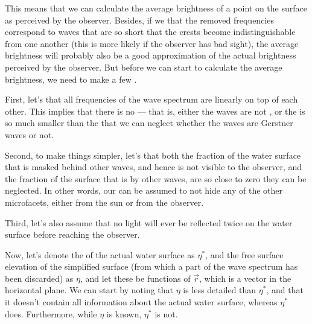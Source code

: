 This means that we can calculate the average brightness of a point on the surface as perceived by the observer. Besides, if we \assume that the removed frequencies correspond to waves that are so short that the crests become indistinguishable from one another (this is more likely if the observer has bad sight), the average brightness will probably also be a good approximation of the actual brightness perceived by the observer. But before we can start to calculate the average brightness, we need to make a few \assumptions.

First, let's \assume that all frequencies of the wave spectrum are \superposed linearly on top of each other. This implies that there is no  --- that is, either the waves are not , or the  is so much smaller than the \wavelength that we can neglect whether the waves are Gerstner waves or not.

Second, to make things simpler, let's \assume that both the fraction of the water surface that is masked behind other waves, and hence is not visible to the observer, and the fraction of the surface that is \shadowed by other waves, are so close to zero they can be neglected. In other words, our \microfacets can be assumed to not hide any of the other microfacets, either from the sun or from the observer.

Third, let's also assume that no light will ever be reflected twice on the water surface before reaching the observer.

Now, let's denote the  of the actual water surface as $\eta^*$, and the free surface elevation of the simplified surface (from which a part of the wave spectrum has been discarded) as $\eta$, and let these be functions of $\vec{r}$, which is a \twodimensional vector in the horizontal plane. We can start by noting that $\eta$ is less detailed than $\eta^*$, and that it doesn't contain all information about the actual water surface, whereas $\eta^*$ does. Furthermore, while $\eta$ is known, $\eta^*$ is not.

